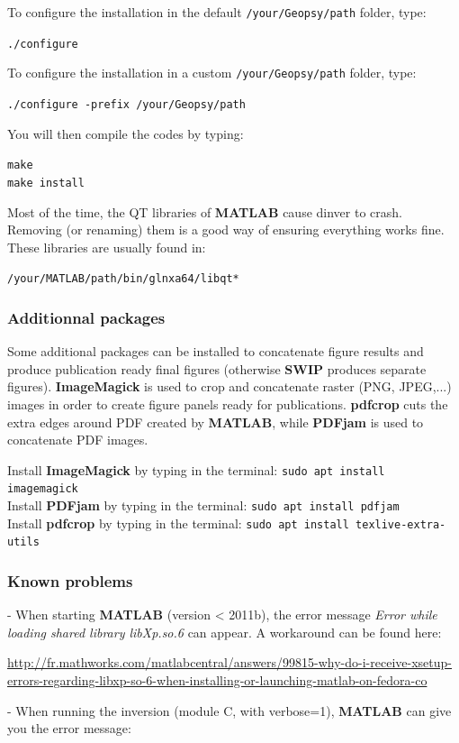 \documentclass[twoside,a4paper]{article}
\def\SWIP{\textbf{SWIP}}
\def\ImageMagick{\textbf{ImageMagick}}
\def\PDFjam{\textbf{PDFjam}}
\def\pdfcrop{\textbf{pdfcrop}}
\def\MATLAB{\textbf{MATLAB}}
\begin{document}
To configure the installation in the default \verb|/your/Geopsy/path| folder, type:

\verb|./configure|

To configure the installation in a custom \verb|/your/Geopsy/path| folder, type:

\verb|./configure -prefix /your/Geopsy/path|

You will then compile the codes by typing:

\verb|make|\\
\verb|make install|

Most of the time, the QT libraries of {\MATLAB} cause dinver to crash. Removing (or renaming) them is a good way of ensuring everything works fine. These libraries are usually found in:

\verb|/your/MATLAB/path/bin/glnxa64/libqt*|\\

\subsubsection{Additionnal packages}
Some additional packages can be installed to concatenate figure results and produce publication ready final figures (otherwise {\SWIP} produces separate figures). {\ImageMagick} is used to crop and concatenate raster (PNG, JPEG,...) images in order to create figure panels ready for publications. {\pdfcrop} cuts the extra edges around PDF created by {\MATLAB}, while {\PDFjam} is used to concatenate PDF images.

Install {\ImageMagick} by typing in the terminal: \verb|sudo apt install imagemagick|\\
Install {\PDFjam} by typing in the terminal: \verb|sudo apt install pdfjam|\\
Install {\pdfcrop} by typing in the terminal: \verb|sudo apt install texlive-extra-utils|

\subsubsection{Known problems}
- When starting {\MATLAB} (version < 2011b), the error message \textit{Error while loading shared library libXp.so.6} can appear. A workaround can be found here:

\url{http://fr.mathworks.com/matlabcentral/answers/99815-why-do-i-receive-xsetup-errors-regarding-libxp-so-6-when-installing-or-launching-matlab-on-fedora-co}

- When running the inversion (module C, with verbose=1), {\MATLAB} can give you the error message:
\end{document}
